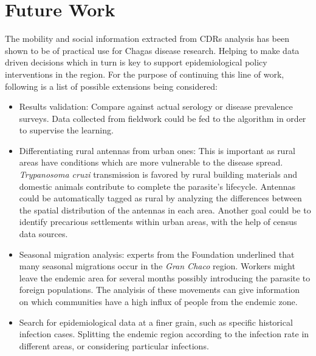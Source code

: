 \section{Future Work}

The mobility and social information extracted from CDRs analysis has been shown to be of practical use for Chagas disease research. Helping to make data driven decisions which in turn is key to support epidemiological policy interventions in the region. For the purpose of continuing this line of work, following is a list of possible extensions being considered:

\begin{itemize}
    \item Results validation: Compare against actual serology or disease prevalence surveys. Data collected from fieldwork could be fed to the algorithm in order to supervise the learning. 
    \item Differentiating rural antennas from urban ones: This is important as rural areas have conditions which are more vulnerable to the disease spread. \textit{Trypanosoma cruzi} transmission is favored by rural building materials and domestic animals contribute to complete the parasite's lifecycle. Antennas could be automatically tagged as rural by analyzing the differences between the spatial distribution of the antennas in each area. Another goal could be to identify precarious settlements within urban areas, with the help of census data sources.
    \item Seasonal migration analysis:  experts from the Foundation underlined that many seasonal migrations occur in the \textit{Gran Chaco} region.  Workers might leave the endemic area for several months possibly introducing the parasite to foreign populations. The analyisis of these movements can give information on which communities have a high influx of people from the endemic zone.
    \item Search for epidemiological data at a finer grain, such as specific historical infection cases. Splitting the endemic region according to the infection rate in different areas, or considering particular infections.
\end{itemize}

